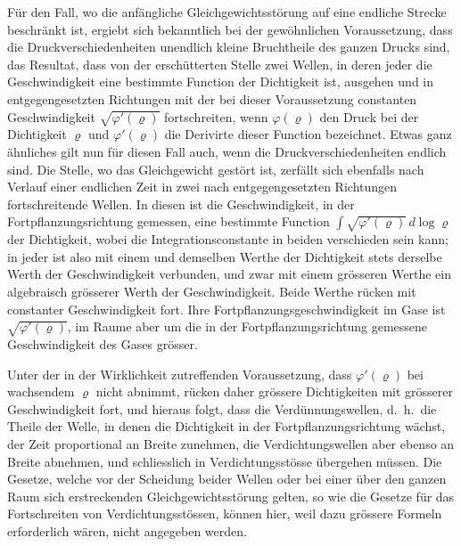 \documentclass[12pt,a4paper]{book}
\theoremstyle{definition}
\theoremstyle{remark}
\begin{document}
F\"ur den Fall, wo die anf\"angliche Gleichgewichtsst\"orung auf eine endliche Strecke beschr\"ankt ist, ergiebt sich bekanntlich bei der gew\"ohnlichen Voraussetzung, dass die Druckverschiedenheiten unendlich kleine Bruchtheile des ganzen Drucks sind, das Resultat, dass von der ersch\"utterten Stelle zwei Wellen, in deren jeder die Geschwindigkeit eine bestimmte Function der Dichtigkeit ist, ausgehen und in entgegengesetzten Richtungen mit der bei dieser Voraussetzung constanten Geschwindigkeit $\sqrt{\varphi'(\varrho)}$ fortschreiten, wenn $\varphi(\varrho)$ den Druck bei der Dichtigkeit $\varrho$ und $\varphi'(\varrho)$ die Derivirte dieser Function bezeichnet. Etwas ganz \"ahnliches gilt nun f\"ur diesen Fall auch, wenn die Druckverschiedenheiten endlich sind. Die Stelle, wo das Gleichgewicht gest\"ort ist, zerf\"allt sich ebenfalls nach Verlauf einer endlichen Zeit in zwei nach entgegengesetzten Richtungen fortschreitende Wellen. In diesen ist die Geschwindigkeit, in der Fortpflanzungsrichtung gemessen, eine bestimmte Function $\int\sqrt{\varphi'(\varrho)}\,d\log\varrho$ der Dichtigkeit, wobei die Integrationsconstante in beiden verschieden sein kann; in jeder ist also mit einem und demselben Werthe der Dichtigkeit stets derselbe Werth der Geschwindigkeit verbunden, und zwar mit einem gr\"osseren Werthe ein algebraisch gr\"osserer Werth der Geschwindigkeit. Beide Werthe r\"ucken mit constanter Geschwindigkeit fort. Ihre Fortpflanzungsgeschwindigkeit im Gase ist $\sqrt{\varphi'(\varrho)}$, im Raume aber um die in der Fortpflanzungsrichtung gemessene Geschwindigkeit des Gases gr\"osser.

Unter der in der Wirklichkeit zutreffenden Voraussetzung, dass $\varphi'(\varrho)$ bei wachsendem $\varrho$ nicht abnimmt, r\"ucken daher gr\"ossere Dichtigkeiten mit gr\"osserer Geschwindigkeit fort, und hieraus folgt, dass die Verd\"unnungswellen, d.~h.~die Theile der Welle, in denen die Dichtigkeit in der Fortpflanzungsrichtung w\"achst, der Zeit proportional an Breite zunehmen, die Verdichtungswellen aber ebenso an Breite abnehmen, und schliesslich in Verdichtungsst\"osse \"ubergehen m\"ussen. Die Gesetze, welche vor der Scheidung beider Wellen oder bei einer \"uber den ganzen Raum sich erstreckenden Gleichgewichtsst\"orung gelten, so wie die Gesetze f\"ur das Fortschreiten von Verdichtungsst\"ossen, k\"onnen hier, weil dazu gr\"ossere Formeln erforderlich w\"aren, nicht angegeben werden.
\end{document}

